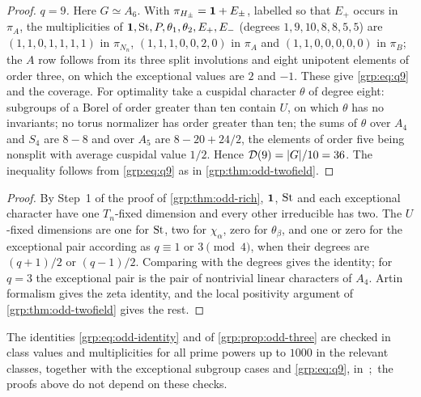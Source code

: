 \begin{proof}
\emph{$q=9$.} Here $G\simeq A_6$. With $\pi_{H_\pm}=\mathbf{1}+E_\pm$, labelled so that $E_+$ occurs in
$\pi_A$, the multiplicities of $\mathbf{1},\mathrm{St},P,\theta_1,\theta_2,E_+,E_-$ (degrees
$1,9,10,8,8,5,5$) are $(1,1,0,1,1,1,1)$ in $\pi_{N_n}$, $(1,1,1,0,0,2,0)$ in $\pi_A$ and
$(1,1,0,0,0,0,0)$ in $\pi_B$; the $A$ row follows from its three split involutions and eight
unipotent elements of order three, on which the exceptional values are $2$ and $-1$. These give
\eqref{grp:eq:q9} and the coverage. For optimality take a cuspidal character $\theta$ of degree
eight: subgroups of a Borel of order greater than ten contain $U$, on which $\theta$ has no
invariants; no torus normalizer has order greater than ten; the sums of $\theta$ over $A_4$ and
$S_4$ are $8-8$ and over $A_5$ are $8-20+24/2$, the elements of order five being nonsplit with
average cuspidal value $1/2$. Hence $\mathcal D(9)=\lvert G\rvert/10=36$. The inequality follows from
\eqref{grp:eq:q9} as in \cref{grp:thm:odd-twofield}.
\end{proof}

\begin{proof}
By Step~1 of the proof of \cref{grp:thm:odd-rich}, $\mathbf{1}$, $\mathrm{St}$ and each exceptional
character have one $T_n$-fixed dimension and every other irreducible has two. The $U$-fixed
dimensions are one for $\mathrm{St}$, two for $\chi_\alpha$, zero for $\theta_\beta$, and one or zero for
the exceptional pair according as $q\equiv1$ or $3\pmod4$, when their degrees are $(q+1)/2$ or
$(q-1)/2$. Comparing with the degrees gives the identity; for $q=3$ the exceptional pair is the
pair of nontrivial linear characters of $A_4$. Artin formalism gives the zeta identity, and the
local positivity argument of \cref{grp:thm:odd-twofield} gives the rest.
\end{proof}

The identities \eqref{grp:eq:odd-identity} and of \cref{grp:prop:odd-three} are checked in class
values and multiplicities for all prime powers up to $1000$ in the relevant classes, together
with the exceptional subgroup cases and \eqref{grp:eq:q9}, in\
{\small{}};\
the proofs above do not depend on these checks.


